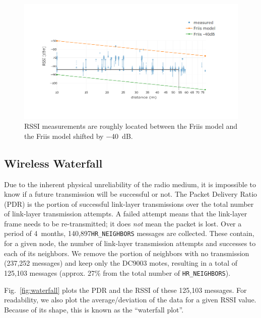 \documentclass{sig-alternate}
\newcommand{\HRNEIGHBORS}         {{\tt HR\_NEIGHBORS}\xspace}
\newcommand{\NUMHRNEIGHBORS}      {140,897\xspace}
\begin{document}
\begin{figure}
    \centering
    \includegraphics[width=\columnwidth]{pister_hack}
    \caption{RSSI measurements are roughly located between the Friis model and the Friis model shifted by $-$40~dB.}
    \label{fig:pister_hack}
\end{figure}

\subsection{Wireless Waterfall}
\label{sec:waterfall}


Due to the inherent physical unreliability of the radio medium, it is impossible to know if a future transmission will be successful or not.
The Packet Delivery Ratio (PDR) is the portion of successful link-layer transmissions over the total number of link-layer transmission attempts.
A failed attempt means that the link-layer frame needs to be re-transmitted; it does \textit{not} mean the packet is lost.
Over a period of 4~months, \NUMHRNEIGHBORS \HRNEIGHBORS messages are collected.
These contain, for a given node, the number of link-layer transmission attempts and successes to each of its neighbors.
We remove the portion of neighbors with no transmission (237,252 messages) and keep only the DC9003 motes, resulting in a total of 125,103 messages (approx. 27\% from the total number of \HRNEIGHBORS).


Fig.~\ref{fig:waterfall} plots the PDR and the RSSI of these 125,103 messages.
For readability, we also plot the average/deviation of the data for a given RSSI value.
Because of its shape, this is known as the ``waterfall plot''.
\end{document}
